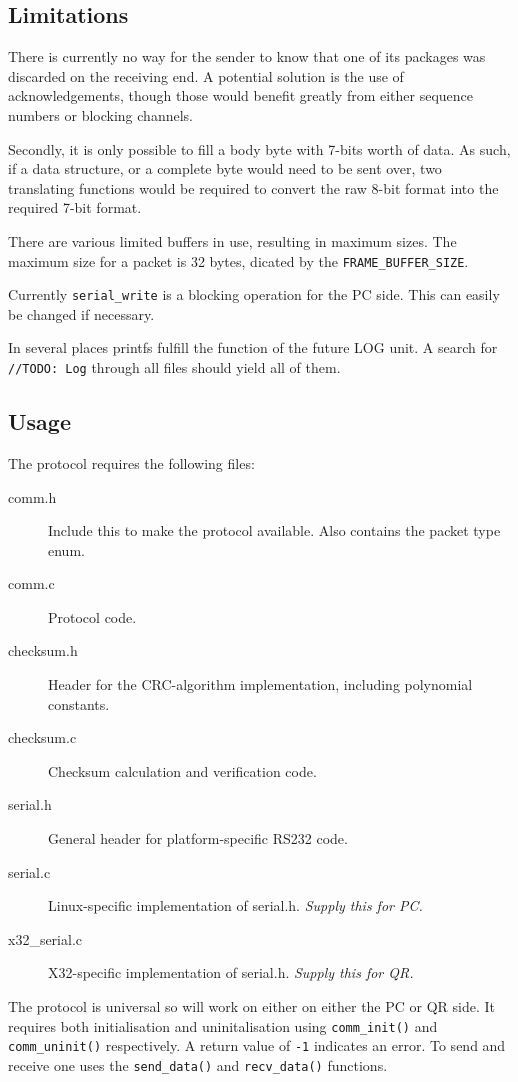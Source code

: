 \documentclass[10pt]{article}
\begin{document}
\subsection*{Limitations}
There is currently no way for the sender to know that one of its packages was discarded on the receiving end. A potential solution is the use of acknowledgements, though those would benefit greatly from either sequence numbers or blocking channels.

Secondly, it is only possible to fill a body byte with 7-bits worth of data. As such, if a data structure, or a complete byte would need to be sent over, two translating functions would be required to convert the raw 8-bit format into the required 7-bit format.

There are various limited buffers in use, resulting in maximum sizes. The maximum size for a packet is 32 bytes, dicated by the \texttt{FRAME\_BUFFER\_SIZE}.

Currently \texttt{serial\_write} is a blocking operation for the PC side. This can easily be changed if necessary.

In several places printfs fulfill the function of the future LOG unit. A search for \texttt{//TODO: Log} through all files should yield all of them.


\subsection*{Usage}
The protocol requires the following files:
\begin{description}
	\item[comm.h]{Include this to make the protocol available. Also contains the packet type enum.}
	\item[comm.c]{Protocol code.}
	\item[checksum.h]{Header for the CRC-algorithm implementation, including polynomial constants.}
	\item[checksum.c]{Checksum calculation and verification code.}
	\item[serial.h]{General header for platform-specific RS232 code.}
	\item[serial.c]{Linux-specific implementation of serial.h. \textit{Supply this for PC.}}
	\item[x32\_serial.c]{X32-specific implementation of serial.h. \textit{Supply this for QR.}}
\end{description}

The protocol is universal so will work on either on either the PC or QR side. It requires both initialisation and uninitalisation using \texttt{comm\_init()} and \texttt{comm\_uninit()} respectively. A return value of \verb=-1= indicates an error. To send and receive one uses the \texttt{send\_data()} and \texttt{recv\_data()} functions.
\end{document}
